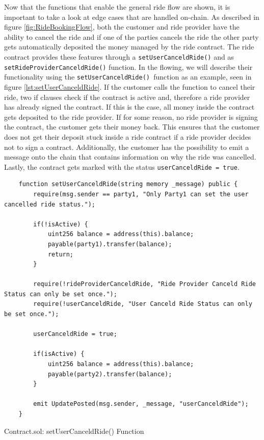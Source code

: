 Now that the functions that enable the general ride flow are shown, it is important to take a look at edge cases that are handled on-chain. As described in figure \ref{fig:RideBookingFlow}, both the customer and ride provider have the ability to cancel the ride and if one of the parties cancels the ride the other party gets automatically deposited the money managed by the ride contract. The ride contract provides these features through a \texttt{setUserCanceldRide()} and as \texttt{setRideProviderCanceldRide()} function. In the flowing, we will describe their functionality using the \texttt{setUserCanceldRide() }function as an example, seen in figure \ref{lst:setUserCanceldRide}. If the customer calls the function to cancel their ride, two if clauses check if the contract is active and, therefore a ride provider has already signed the contract. If this is the case, all money inside the contract gets deposited to the ride provider. If for some reason, no ride provider is signing the contract, the customer gets their money back. This ensures that the customer does not get their deposit stuck inside a ride contract if a ride provider decides not to sign a contract. Additionally, the customer has the possibility to emit a message onto the chain that contains information on why the ride was cancelled.
Lastly, the contract gets marked with the status \texttt{userCanceldRide = true}.

\lstset{
  basicstyle=\footnotesize\ttfamily,
  breaklines=true,
  numbers=left,
  firstnumber=176
}

\begin{Listing}
\begin{lstlisting}
    function setUserCanceldRide(string memory _message) public {
        require(msg.sender == party1, "Only Party1 can set the user cancelled ride status.");
        
        if(!isActive) {
            uint256 balance = address(this).balance;
            payable(party1).transfer(balance);
            return;
        }

        require(!rideProviderCanceldRide, "Ride Provider Canceld Ride Status can only be set once.");
        require(!userCanceldRide, "User Canceld Ride Status can only be set once.");

        userCanceldRide = true;
        
        if(isActive) {
            uint256 balance = address(this).balance;
            payable(party2).transfer(balance);
        }
        
        emit UpdatePosted(msg.sender, _message, "userCanceldRide");
    }
\end{lstlisting}
  \caption{Contract.sol: setUserCanceldRide() Function}
  \label{lst:setUserCanceldRide}
\end{Listing}

